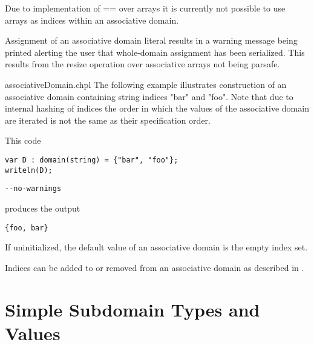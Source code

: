 \begin{future}
Due to implementation of == over arrays it is currently not possible to use
arrays as indices within an associative domain. 
\end{future}

\begin{openissue}
Assignment of an associative domain literal results in a warning message
being printed alerting the user that whole-domain assignment has been
serialized. This results from the resize operation over associative arrays not
being parsafe. 
\end{openissue}

\begin{chapelexample}{associativeDomain.chpl}
The following example illustrates construction of an associative domain
containing string indices "bar" and "foo".  Note that due to internal hashing 
of indices the order in which the values of the associative domain are iterated
is not the same as their specification order.

This code
\begin{chapel}
\begin{verbatim}
var D : domain(string) = {"bar", "foo"};
writeln(D);
\end{verbatim}
\end{chapel}
\begin{chapelcompopts}
\begin{verbatim}
--no-warnings
\end{verbatim}
\end{chapelcompopts}
produces the output
\begin{chapelprintoutput}
\begin{verbatim}
{foo, bar}
\end{verbatim}
\end{chapelprintoutput}
\end{chapelexample}


If uninitialized, the default value of an associative domain is the
empty index set.

Indices can be added to or removed from an associative domain
as described in .


\section{Simple Subdomain Types and Values}
\label{Simple_Subdomain_Types_and_Values}

